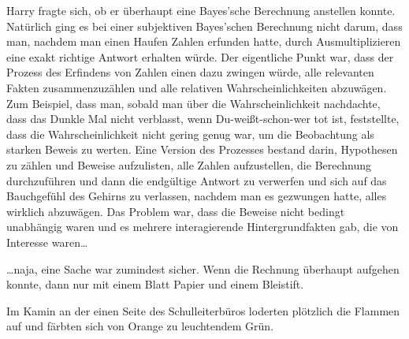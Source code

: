 Harry fragte sich, ob er überhaupt eine Bayes'sche Berechnung anstellen konnte. Natürlich ging es bei einer subjektiven Bayes'schen Berechnung nicht darum, dass man, nachdem man einen Haufen Zahlen erfunden hatte, durch Ausmultiplizieren eine exakt richtige Antwort erhalten würde. Der eigentliche Punkt war, dass der Prozess des Erfindens von Zahlen einen dazu zwingen würde, alle relevanten Fakten zusammenzuzählen und alle relativen Wahrscheinlichkeiten abzuwägen. Zum Beispiel, dass man, sobald man über die Wahrscheinlichkeit nachdachte, dass das Dunkle Mal nicht verblasst, wenn Du-weißt-schon-wer tot ist, feststellte, dass die Wahrscheinlichkeit nicht gering genug war, um die Beobachtung als starken Beweis zu werten. Eine Version des Prozesses bestand darin, Hypothesen zu zählen und Beweise aufzulisten, alle Zahlen aufzustellen, die Berechnung durchzuführen und dann die endgültige Antwort zu verwerfen und sich auf das Bauchgefühl des Gehirns zu verlassen, nachdem man es gezwungen hatte, alles wirklich abzuwägen. Das Problem war, dass die Beweise nicht bedingt unabhängig waren und es mehrere interagierende Hintergrundfakten gab, die von Interesse waren…

…naja, eine Sache war zumindest sicher. Wenn die Rechnung überhaupt aufgehen konnte, dann nur mit einem Blatt Papier und einem Bleistift.

Im Kamin an der einen Seite des Schulleiterbüros loderten plötzlich die Flammen auf und färbten sich von Orange zu leuchtendem Grün.

